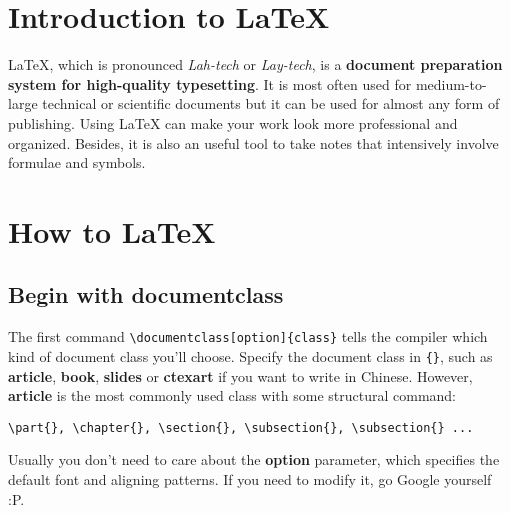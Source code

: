 \documentclass[]{article}
\title{\ttfamily{\LaTeX \;Intro Manual}}
\author{\ttfamily{jan\_chen}}
\date{\ttfamily{September 2023}}
\begin{document}
    
\maketitle
\tableofcontents

\section{Introduction to \LaTeX}

LaTeX, which is pronounced 
\textit{Lah-tech} or \textit{Lay-tech}, is a \textbf{document preparation system for high-quality typesetting}. It is most often used for medium-to-large technical or scientific documents but it can be used for almost any form of publishing. Using LaTeX can make your work look more professional and organized. Besides, it is also an useful tool to take notes that intensively involve formulae and symbols.

\section{How to \LaTeX }

\subsection{Begin with documentclass}
The first command \verb|\documentclass[option]{class}| tells the compiler which kind of document class you'll choose. Specify the document class in \verb|{}|, such as \textbf{article}, \textbf{book}, \textbf{slides} or \textbf{ctexart} if you want to write in Chinese. However, \textbf{article} is the most commonly used class with some structural command:
\begin{lstlisting}[basicstyle = \ttfamily]
\part{}, \chapter{}, \section{}, \subsection{}, \subsection{} ...
\end{lstlisting}
Usually you don't need to care about the \textbf{option} parameter, which specifies the default font and aligning patterns. If you need to modify it, go Google yourself :P.
\end{document}

